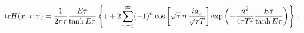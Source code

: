 \begin{equation}
  \label{eq:actorheat2}
{\rm tr}H(x,x;\tau)= {1 \over 2\pi\tau} {E\tau \over \tanh E\tau} 
\left\{ 1 + 2 \sum\limits_{n=1}^\infty (-1)^n 
        \cos\left[ 
               \sqrt{\tau} \, n \, {i a_0 \over \sqrt{\tau}T}
            \right]
        \exp \left(- {n^2 \over 4 \tau T^2} {E \tau \over \tanh E\tau} \right)
\right\}    \,.
\end{equation}

